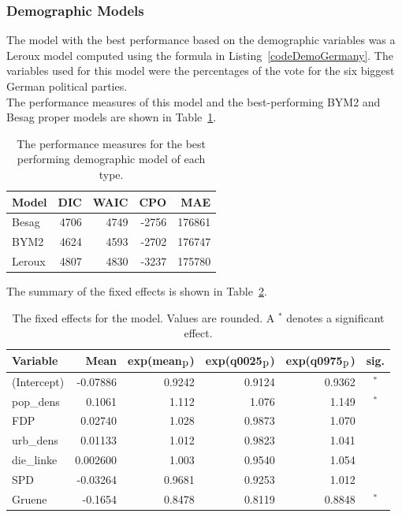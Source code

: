 \subsubsection{Demographic Models}\label{sssec:demoGermany}
The model with the best performance based on the demographic variables was a Leroux model computed using the formula in Listing~\ref{codeDemoGermany}. The variables used for this model were the percentages of the vote for the six biggest German political parties. \\
The performance measures of this model and the best-performing BYM2 and Besag proper models are shown in Table~\ref{demoGermany}. 
\begin{table}[H] 
\caption{The performance measures for the best performing demographic model of each type. \label{demoGermany}}
\begin{tabular}{l r r r r}
\toprule
\textbf{Model}	& \textbf{DIC}	& \textbf{WAIC} & \textbf{CPO} & \textbf{MAE}\\
\midrule
Besag  & 4706 & 4749 & -2756 &  176861 \\
BYM2 & 4624 & 4593  & -2702 &  176747\\
Leroux & 4807  & 4830 & -3237 & 175780\\
\bottomrule
\end{tabular}
\end{table}
The summary of the fixed effects is shown in Table~\ref{fixedDemoGermany_spatial}.
\begin{table}[H]
\caption{The fixed effects for the model. Values are rounded. A $^*$ denotes a significant effect. \label{fixedDemoGermany_spatial}}
\begin{tabular}{l r r r r c}
\toprule
\textbf{Variable}	& \textbf{Mean}	& \textbf{exp(mean$_{\hbox{p}}$)} & \textbf{exp(q0025$_{\hbox{p}}$)} & \textbf{exp(q0975$_{\hbox{p}}$)} & \textbf{sig.}\\
\midrule
(Intercept) & -0.07886 & 0.9242 & 0.9124 & 0.9362 & $^*$\\
pop\_dens & 0.1061 & 1.112 & 1.076 & 1.149 &$^*$\\
FDP & 0.02740 & 1.028 & 0.9873 & 1.070 &\\
urb\_dens & 0.01133 & 1.012 & 0.9823 & 1.041 &\\
die\_linke & 0.002600 & 1.003 & 0.9540 & 1.054 & \\
SPD & -0.03264 & 0.9681 & 0.9253 & 1.012 &\\
Gruene & -0.1654 & 0.8478 & 0.8119 & 0.8848 & $^*$\\
\bottomrule
\end{tabular}
\end{table}
